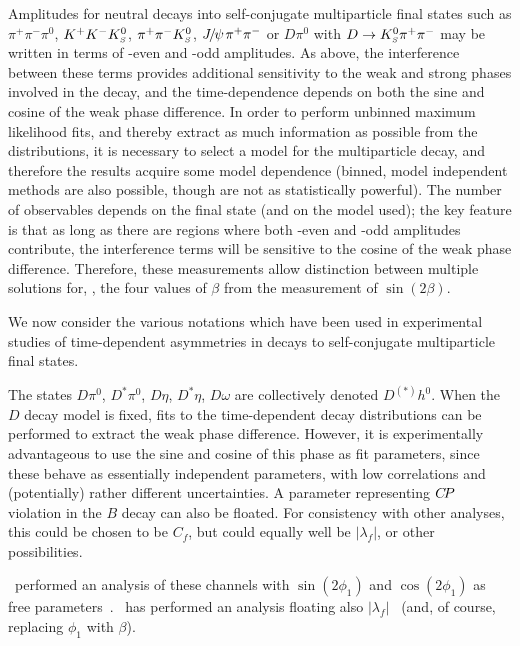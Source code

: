 Amplitudes for neutral \B decays into 
self-conjugate multiparticle final states
such as $\pi^+\pi^-\pi^0$, $K^+K^-K^0_{\scriptscriptstyle S}$, $\pi^+\pi^-K^0_{\scriptscriptstyle S}$,
${J\mskip -3mu/\mskip -2mu\psi\mskip 2mu} \pi^+\pi^-$ or $D\pi^0$ with $D \to K^0_{\scriptscriptstyle S}\pi^+\pi^-$
may be written in terms of \CP-even and \CP-odd amplitudes.
As above, the interference between these terms 
provides additional sensitivity to the weak and strong phases
involved in the decay,
and the time-dependence depends on both the sine and cosine
of the weak phase difference.
In order to perform unbinned maximum likelihood fits,
and thereby extract as much information as possible from the distributions,
it is necessary to select a model for the multiparticle decay,
and therefore the results acquire some model dependence
(binned, model independent methods are also possible,
though are not as statistically powerful).
The number of observables depends on the final state (and on the model used);
the key feature is that as long as there are regions where both
\CP-even and \CP-odd amplitudes contribute,
the interference terms will be sensitive to the cosine 
of the weak phase difference.
Therefore, these measurements allow distinction between multiple solutions
for, \eg, the four values of $\beta$ from the measurement of $\sin(2\beta)$.

We now consider the various notations which have been used 
in experimental studies of
time-dependent asymmetries in decays to self-conjugate multiparticle final states.

\newpage %
\label{sec:cp_uta:notations:dalitz:dh0}

The states $D\pi^0$, $D^*\pi^0$, $D\eta$, $D^*\eta$, $D\omega$
are collectively denoted $D^{(*)}h^0$.
When the $D$ decay model is fixed,
fits to the time-dependent decay distributions can be performed
to extract the weak phase difference.
However, it is experimentally advantageous to use the sine and cosine of 
this phase as fit parameters, since these behave as essentially 
independent parameters, with low correlations and (potentially)
rather different uncertainties.
A parameter representing $C\!P$ violation in the $B$ decay 
can also be floated.  
For consistency with other analyses, this could be chosen to be $C_f$,
but could equally well be $\left| \lambda_f \right|$, or other possibilities.

\belle\ performed an analysis of these channels
with $\sin(2\phi_1)$ and $\cos(2\phi_1)$ as free parameters~\cite{Krokovny:2006sv}.
\babar\ has performed an analysis floating also $\left| \lambda_f \right|$~\cite{Aubert:2007rp}
(and, of course, replacing $\phi_1$ with $\beta$).

